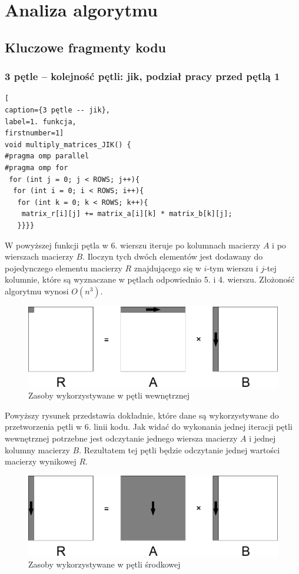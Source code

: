 \documentclass{article}
\begin{document}
\section{Analiza algorytmu}
\subsection{Kluczowe fragmenty kodu}
\subsubsection{3 pętle -- kolejność pętli: jik, podział pracy przed pętlą 1}
\begin{lstlisting}[
caption={3 pętle -- jik},
label=1. funkcja,
firstnumber=1]
void multiply_matrices_JIK() {
#pragma omp parallel
#pragma omp for 
 for (int j = 0; j < ROWS; j++){
  for (int i = 0; i < ROWS; i++){
   for (int k = 0; k < ROWS; k++){
    matrix_r[i][j] += matrix_a[i][k] * matrix_b[k][j];
   }}}}
\end{lstlisting}

W powyższej funkcji pętla w 6. wierszu iteruje po kolumnach macierzy $A$ i po wierszach macierzy $B$. Iloczyn tych dwóch elementów jest dodawany do pojedynczego elementu macierzy $R$ znajdującego się w $i$-tym wierszu i $j$-tej kolumnie, które są wyznaczane w pętlach odpowiednio 5. i 4. wierszu. Złożoność algorytmu wynosi $O(n^3)$.

\begin{figure}[H]
	\centering
	\includegraphics[width=\linewidth]{./images/3/lokIn.png}
	\caption{Zasoby wykorzystywane w pętli wewnętrznej}
	\label{fig:3inner}
\end{figure}

Powyższy rysunek przedstawia dokładnie, które dane są wykorzystywane do przetworzenia pętli w 6. linii kodu. Jak widać do wykonania jednej iteracji pętli wewnętrznej potrzebne jest odczytanie jednego wiersza macierzy $A$ i jednej kolumny macierzy $B$. Rezultatem tej pętli będzie odczytanie jednej wartości macierzy wynikowej $R$.

\begin{figure}[H]
	\centering
	\includegraphics[width=\linewidth]{./images/3/lokMed.png}
	\caption{Zasoby wykorzystywane w pętli środkowej}
	\label{fig:3medium}
\end{figure}
\end{document}
